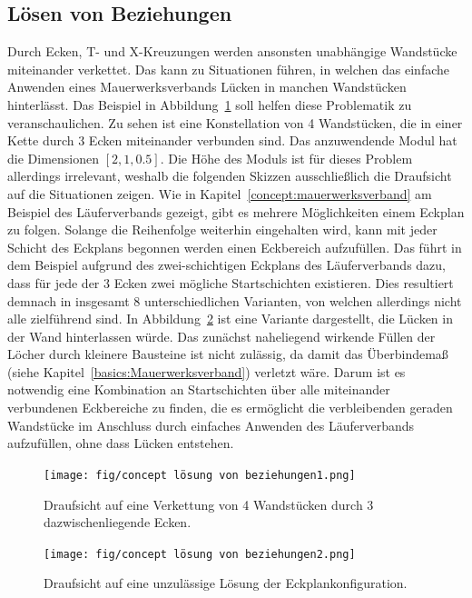 \subsection{Lösen von Beziehungen}\label{concept:solving_beziehungen}
Durch Ecken, T- und X-Kreuzungen werden ansonsten unabhängige Wandstücke miteinander verkettet.
Das kann zu Situationen führen, in welchen das einfache Anwenden eines Mauerwerksverbands Lücken in manchen Wandstücken hinterlässt.
Das Beispiel in Abbildung~\ref{fig:concept:loesen_von_beziehungen1} soll helfen diese Problematik zu veranschaulichen.
Zu sehen ist eine Konstellation von 4 Wandstücken, die in einer Kette durch 3 Ecken miteinander verbunden sind.
Das anzuwendende Modul hat die Dimensionen \([2, 1, 0.5]\). 
Die Höhe des Moduls ist für dieses Problem allerdings irrelevant, weshalb die folgenden Skizzen ausschließlich die Draufsicht auf die Situationen zeigen.
Wie in Kapitel~\ref{concept:mauerwerksverband} am Beispiel des Läuferverbands gezeigt, gibt es mehrere Möglichkeiten einem Eckplan zu folgen.
Solange die Reihenfolge weiterhin eingehalten wird, kann mit jeder Schicht des Eckplans begonnen werden einen Eckbereich aufzufüllen.
Das führt in dem Beispiel aufgrund des zwei-schichtigen Eckplans des Läuferverbands dazu, dass für jede der 3 Ecken zwei mögliche Startschichten existieren.
Dies resultiert demnach in insgesamt 8 unterschiedlichen Varianten, von welchen allerdings nicht alle zielführend sind.
In Abbildung~\ref{fig:concept:loesen_von_beziehungen2} ist eine Variante dargestellt, die Lücken in der Wand hinterlassen würde.
Das zunächst naheliegend wirkende Füllen der Löcher durch kleinere Bausteine ist nicht zulässig, da damit das Überbindemaß (siehe Kapitel~\ref{basics:Mauerwerksverband}) verletzt wäre.
Darum ist es notwendig eine Kombination an Startschichten über alle miteinander verbundenen Eckbereiche zu finden, die es ermöglicht die verbleibenden geraden Wandstücke im Anschluss durch einfaches Anwenden des Läuferverbands aufzufüllen, ohne dass Lücken entstehen.

\begin{figure}[]
    \centering
    \texttt{[image: fig/concept lösung von beziehungen1.png]}
    \caption{Draufsicht auf eine Verkettung von 4 Wandstücken durch 3 dazwischenliegende Ecken.}
    \label{fig:concept:loesen_von_beziehungen1}
\end{figure}

\begin{figure}[]
    \centering
    \texttt{[image: fig/concept lösung von beziehungen2.png]}
    \caption{Draufsicht auf eine unzulässige Lösung der Eckplankonfiguration.}
    \label{fig:concept:loesen_von_beziehungen2}
\end{figure}


